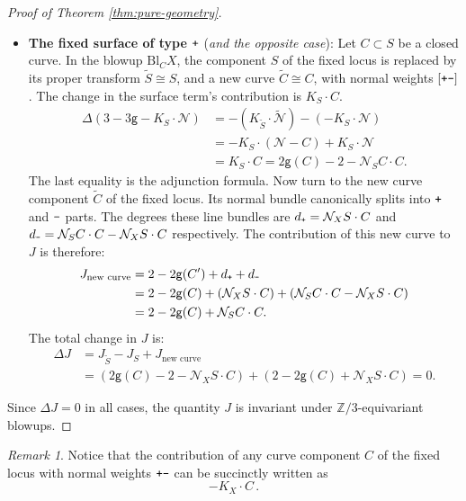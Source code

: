 \documentclass[12pt,a4paper]{amsart}
\theoremstyle{definition}
\theoremstyle{remark}
\newtheorem{remark}[theorem]{Remark}
\newcommand{\lp}{\textup{\texttt{+}}}
\newcommand{\lm}{\textup{\texttt{-}}}
\begin{document}
\begin{proof}[Proof of Theorem \ref{thm:pure-geometry}]
\begin{itemize}
    \item  \textbf{The fixed surface of type $\lp$} (\textit{and the opposite case}): Let $C \subset S$ be a closed curve. In the blowup $\mathrm{Bl}_CX$, the component $S$ of the fixed locus is replaced by its proper transform $\widetilde{S}\cong S$, and a new curve $\widetilde C\cong C$, with normal weights $[\lp\lm]$. The change in the surface term's contribution is $K_S \cdot C$.
    \begin{align}
        \Delta(3-3\mathsf{g}-K_S\cdot\mathcal{N}) &= -(K_{\widetilde{S}}\cdot\widetilde{\mathcal{N}}) - (-K_S\cdot\mathcal{N})\\
        &= -K_S\cdot(\mathcal{N}-C) + K_S\cdot\mathcal{N}\\
        &= K_S \cdot C= 2\mathsf{g}(C) - 2 - \mathcal N_S C\cdot C.
    \end{align}
    The last equality is the adjunction formula. Now turn to the new curve component  $\widetilde C$ of the fixed locus. Its normal bundle canonically splits into $\lp$ and $\lm$ parts. The degrees these line bundles are $d_\lp = \mathcal{N}_XS \cdot C$ and $d_\lm = \mathcal N_S C\cdot C - \mathcal{N}_XS \cdot C$ respectively. The contribution of this new curve to $J$ is therefore:
    \begin{align}
        J_{\text{new curve}} &= 2 - 2\mathsf{g}(C') + d_\lp + d_\lm \\
        &= 2 - 2\mathsf{g}(C) + (\mathcal{N}_XS \cdot C) + (\mathcal N_S C\cdot C - \mathcal{N}_XS \cdot C) \\
        &= 2 - 2\mathsf{g}(C) + \mathcal N_S C\cdot C.
    \end{align}
    The total change in $J$ is:
    \begin{align}
        \Delta J &= J_{\widetilde S}-J_S+J_{\text{new curve}}\\
        &= (2\mathsf{g}(C) - 2 -  \mathcal{N}_XS \cdot C) + (2 - 2\mathsf{g}(C) +  \mathcal{N}_XS \cdot C) =0.
    \end{align}
\end{itemize}

Since $\Delta J = 0$ in all cases, the quantity $J$ is invariant under $\mathbb{Z}/3$-equivariant blowups.
\end{proof}

\begin{remark} Notice that the contribution of any curve component $C$ of the fixed locus with normal weights $\lp\lm$ can be succinctly written as
\[-K_X\cdot C\,.\]\label{rem:+-contribution}
\end{remark}
\end{document}
